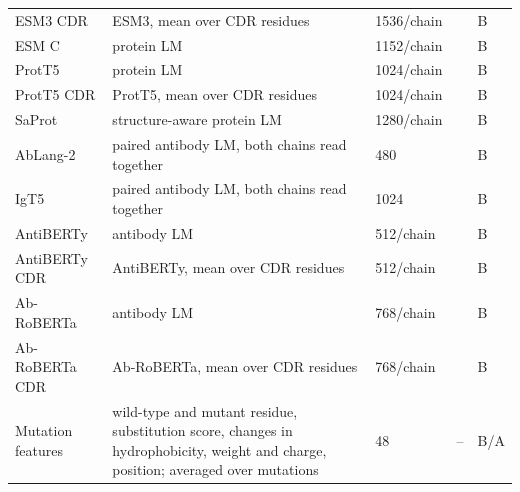 \begin{longtable}{P{2.8cm}P{4.6cm}P{2.0cm}P{1.5cm}P{1.4cm}}
ESM3 CDR & ESM3, mean over CDR residues & 1536/chain & \citep{Hayes2025} & B \\
ESM C & protein LM & 1152/chain & \citep{Candido2026} & B \\
ProtT5 & protein LM & 1024/chain & \citep{Elnaggar2022} & B \\
ProtT5 CDR & ProtT5, mean over CDR residues & 1024/chain & \citep{Elnaggar2022} & B \\
SaProt & structure-aware protein LM & 1280/chain & \citep{Su2023SaProt} & B \\
AbLang-2 & paired antibody LM, both chains read together & 480 & \citep{Olsen2024} & B \\
IgT5 & paired antibody LM, both chains read together & 1024 & \citep{Kenlay2024IgT5} & B \\
AntiBERTy & antibody LM & 512/chain & \citep{Ruffolo2021AntiBERTy} & B \\
AntiBERTy CDR & AntiBERTy, mean over CDR residues & 512/chain & \citep{Ruffolo2021AntiBERTy} & B \\
Ab-RoBERTa & antibody LM & 768/chain & \citep{Huh2025} & B \\
Ab-RoBERTa CDR & Ab-RoBERTa, mean over CDR residues & 768/chain & \citep{Huh2025} & B \\
Mutation features & wild-type and mutant residue, substitution score, changes in hydrophobicity, weight and charge, position; averaged over mutations & 48 & -- & B/A \\
\end{longtable}

